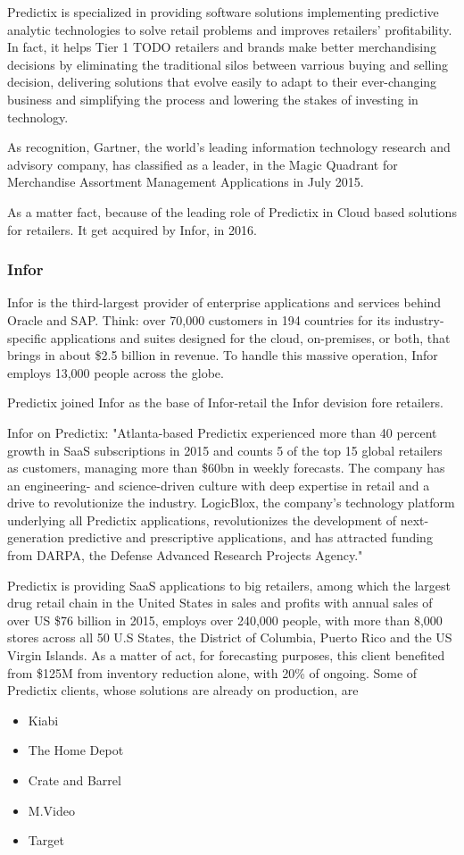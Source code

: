 Predictix is specialized in providing software solutions implementing predictive
analytic technologies to solve retail problems and improves retailers'
profitability. In fact, it helps Tier 1 TODO retailers and brands make better
merchandising decisions  by eliminating the traditional silos between varrious
buying and selling decision, delivering solutions that evolve easily to adapt to
their ever-changing business and simplifying the process and lowering the stakes
of investing in technology.

As recognition, Gartner, the world's leading information technology research and
advisory company, has classified as a leader, in the Magic Quadrant for
Merchandise Assortment Management Applications in July 2015.

As a matter fact, because of the leading role of Predictix in Cloud based
solutions for retailers. It get acquired by Infor, in 2016.

\subsubsection{Infor}
Infor is the third-largest provider of enterprise applications and services
behind Oracle and SAP. Think: over 70,000 customers in 194 countries for its
industry-specific applications and suites designed for the cloud, on-premises,
or both, that brings in about \$2.5 billion in revenue. To handle this massive
operation, Infor employs 13,000 people across the globe.

Predictix joined Infor as the base of Infor-retail the Infor devision fore
retailers.

Infor on Predictix:
"Atlanta-based Predictix experienced more than 40 percent growth in SaaS
subscriptions in 2015 and counts 5 of the top 15 global retailers as customers,
managing more than \$60bn in weekly forecasts. The company has an engineering-
and science-driven culture with deep expertise in retail and a drive to
revolutionize the industry. LogicBlox, the company's technology platform
underlying all Predictix applications, revolutionizes the development of
next-generation predictive and prescriptive applications, and has attracted
funding from DARPA, the Defense Advanced Research Projects Agency."

Predictix is providing SaaS applications to big retailers, among which the
largest drug retail chain in the United States in sales and profits with annual
sales of over US \$76 billion in 2015, employs over 240,000 people, with more
than 8,000 stores  across all 50 U.S States, the District of Columbia, Puerto
Rico and the US Virgin Islands. As a matter of act, for forecasting purposes,
this client benefited from \$125M from inventory reduction alone, with 20\% of
ongoing. Some of Predictix clients, whose solutions are already on production,
are
\begin{itemize}
\item{Kiabi}
\item{The Home Depot}
\item{Crate and Barrel}
\item{M.Video}
\item{Target}
\end{itemize}

